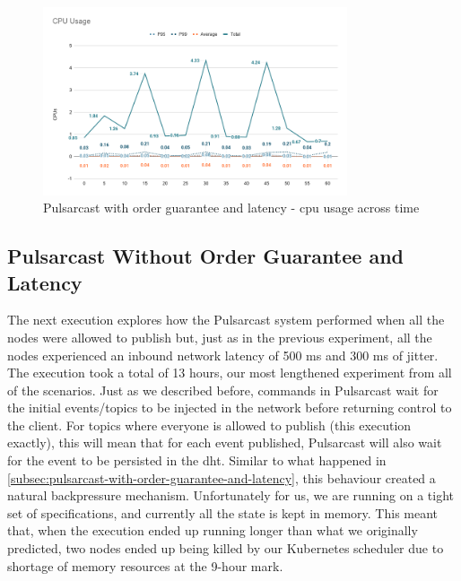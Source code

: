 \begin{figure}[!htb]
  \centering
  \includegraphics[width=0.8\textwidth]{img/graph-pulsarcast-order-latency-cpu.png}
  \caption{Pulsarcast with order guarantee and latency - \acrshort{cpu} usage across time}
  \label{fig:graph-pulsarcast-order-latency-cpu}
\end{figure}

\subsection{Pulsarcast Without Order Guarantee and Latency}\label{subsec:pulsarcast-without-order-guarantee-and-latency}

The next execution explores how the Pulsarcast system performed when all the
nodes were allowed to publish but, just as in the previous experiment, all the
nodes experienced an inbound network latency of 500 ms and 300 ms of jitter.
The execution took a total of 13 hours, our most lengthened experiment from all
of the scenarios. Just as we described before, commands in Pulsarcast wait for
the initial events/topics to be injected in the network before returning
control to the client. For topics where everyone is allowed to publish (this
execution exactly), this will mean that for each event published, Pulsarcast
will also wait for the event to be persisted in the \acrshort{dht}. Similar to
what happened in \ref{subsec:pulsarcast-with-order-guarantee-and-latency}, this
behaviour created a natural backpressure mechanism. Unfortunately for us, we
are running on a tight set of specifications, and currently all the state is
kept in memory. This meant that, when the execution ended up running longer
than what we originally predicted, two nodes ended up being killed by our
Kubernetes scheduler due to shortage of memory resources at the 9-hour mark.

